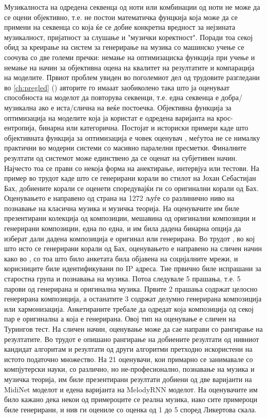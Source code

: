 Музикалноста на одредена секвенца од ноти или комбинации од ноти не може да се оцени објективно, т.е. не постои математичка фунцкија која може да се примени на секвенца со која ќе се добие конкретна вредност за нејзината музикалност, пријатност за слушање и "музички коректност". Поради тоа секој обид за креирање на систем за генерирање на музика со машинско учење се соочува со две големи пречки: немање на оптимизациска функција при учење и немање на начин за објективна оцена на квалитет на резултатите и компарација на моделите. 
Првиот проблем увиден во поголемиот дел од трудовите разгледани во \ref{ch:pregled} (\cite{Tikhonov2017,Boulanger-Lewandowski2012,Boulanger-Lewandowski2014,Liang2017,Johnson2017,Yang2017,Eck2002,Goel2014}) авторите го имааат заобиколено така што ја оценуваат способноста на моделот да повторува секвенци, т.е. една секвенца е добра/музикална ако е иста/слична на веќе постоечка. Објективна функција за оптимизација на моделите која ја користат е одредена варијанта на крос-ентропија, бинарна или категорична. Постојат и историски примери каде што објективната функција за оптимизација е човек оценувач \cite{Biles1994}, меѓутоа не се нималку практични во модерни системи со масивно паралелни пресметки.
Финалните резултати од системот може единствено да се оценат на субјетивен начин. Најчесто тоа се прави со некоја форма на анектирање, интервјуа или тестови. На пример во трудот \cite{Hadjeres2016} каде што се генерирани корали во стилот на Јохан Себастијан Бах, добиените корали се оценети споредувајќи ги со оригинални корали од Бах. Оценувањето е направено од страна на 1272 љуѓе со разлинично ниво на познавање на класична музика и музичка теорија. На оценувачите им биле презентирани колекција од композиции, мешавина од оригинални композиции и генерирани композиции, една по една, и им била дадена бинарна опција да изберат дали дадена композиција е оригинал или генерирана.
Во трудот \cite{Liang2017}, во кој што исто се генерирани корали од Бах, оценувањето е направено на сличен начин како во \cite{Hadjeres2016}, со тоа што било анкетата била објавена на социјалните мрежи, и корисниците биле идентификувани по IP адреса. Тие првично биле испрашани за старостна група и познавања на музика. Потоа следувале 5 прашања, т.е. 5 парови од генерирана и оригинална музика. Првите 2 прашања содржат целосно генерирана композиција, а останатите 3 содржат делумно генерирана композиција или хармонизација. Анкетираните требале да одредат која композиција од секој пар е оригинална а која е генерирана.
Овој тип на оценување е сличен на Турингов тест. На сличен начин, оценување може да сае направи со рангирање на резултатите. Во трудот \cite{Yang2017} е опишано рангирање на добиените резултати од нивниот кандидат алгоритам и резултати од други алгоритми претходно искористени на истото податочно множество. На 21 оценувачи, кои примарно се занимавале со компјутерски науки, со различно, но не-професионално, познавање на музика и музичка теорија, им биле презентирани резултати добиени од две варијанти на MidiNet моделот и едена варијанта на MelodyRNN моделот. На оценувачите им било кажано дека некои од примероците се реална музика, иако сите примероци биле генерирани, и нив ги оцениле со оценка од 1 до 5 според Ликертова скала.
